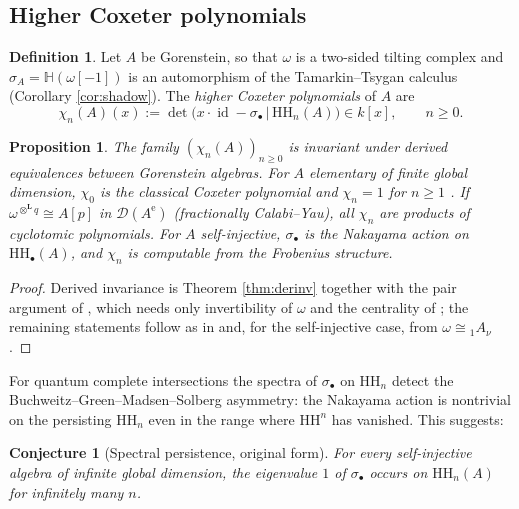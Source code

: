 \documentclass[11pt]{amsart}
\newtheorem{proposition}[theorem]{Proposition}
\newtheorem{conjecture}[theorem]{Conjecture}
\theoremstyle{definition}
\newtheorem{definition}[theorem]{Definition}
\newcommand{\HH}{\mathrm{HH}}
\newcommand{\id}{\operatorname{id}}
\newcommand{\Ae}{A^{\mathrm{e}}}
\newcommand{\der}{\mathcal{D}}
\newcommand{\Lotimes}{\otimes^{\mathbf{L}}}
\newcommand{\kk}{k}
\begin{document}
\subsection{Higher Coxeter polynomials}

\begin{definition}\label{def:highercox}
Let $A$ be Gorenstein, so that $\omega$ is a two-sided tilting complex
\cite{HappelGor} and $\sigma_A=\mathbb H(\omega[-1])$ is an automorphism of
the Tamarkin--Tsygan calculus (Corollary \ref{cor:shadow}). The
\emph{higher Coxeter polynomials} of $A$ are
\[
\chi_n(A)(x):=\det\bigl(x\cdot\id-\sigma_\bullet\,\big|\,\HH_n(A)\bigr)
\in\kk[x],\qquad n\ge0 .
\]
\end{definition}

\begin{proposition}\label{prop:highercox}
The family $(\chi_n(A))_{n\ge0}$ is invariant under derived equivalences
between Gorenstein algebras. For $A$ elementary of finite global dimension,
$\chi_0$ is the classical Coxeter polynomial and $\chi_n=1$ for $n\ge1$
\cite{ArmCox}. If $\omega^{\Lotimes q}\cong A[p]$ in $\der(\Ae)$
(fractionally Calabi--Yau), all $\chi_n$ are products of cyclotomic
polynomials. For $A$ self-injective, $\sigma_\bullet$ is the Nakayama action
on $\HH_\bullet(A)$, and $\chi_n$ is computable from the Frobenius structure.
\end{proposition}

\begin{proof}
Derived invariance is Theorem \ref{thm:derinv} together with the pair
argument of \cite[Theorem 4.2(3)]{ArmCox}, which needs only invertibility of
$\omega$ and the centrality of \cite[Lemma 3.4]{ArmCox}; the remaining
statements follow as in \cite[Theorem 5.5, Corollary 5.15]{ArmCox} and, for
the self-injective case, from $\omega\cong{}_1A_\nu$.
\end{proof}

For quantum complete intersections the spectra of $\sigma_\bullet$ on
$\HH_n$ detect the Buchweitz--Green--Madsen--Solberg asymmetry: the Nakayama
action is nontrivial on the persisting $\HH_n$ even in the range where $\HH^n$
has vanished. This suggests:

\begin{conjecture}[Spectral persistence, original form]\label{conj:spectral}
For every self-injective algebra of infinite global dimension, the eigenvalue
$1$ of $\sigma_\bullet$ occurs on $\HH_n(A)$ for infinitely many $n$.
\end{conjecture}
\end{document}
